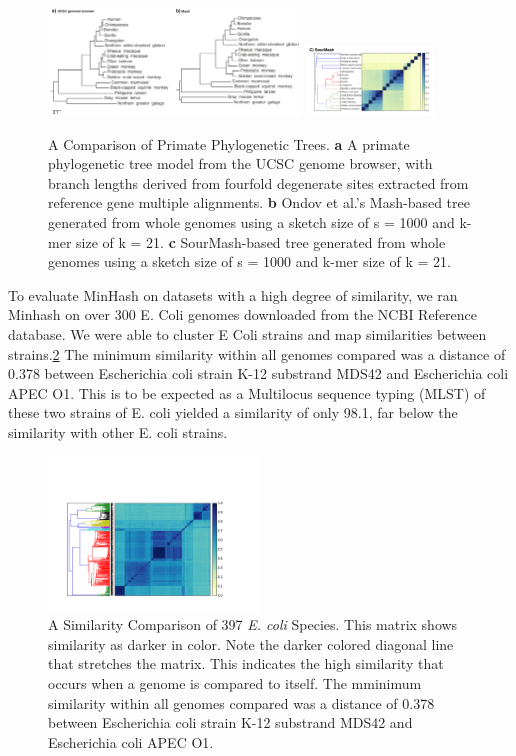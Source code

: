 \documentclass[12pt, letterpaper]{article}
\begin{document}
\begin{figure}[h]
    \centering
    \includegraphics[width=0.6\textwidth]{Figure4_Ondov}
    \includegraphics[width=0.3\textwidth]{Apes_Matrix_Common}
    \caption{A Comparison of Primate Phylogenetic Trees. \textbf{a} A primate phylogenetic tree model from the UCSC genome browser, with branch lengths derived from fourfold degenerate sites extracted from reference gene multiple alignments. \textbf{b} Ondov et al.'s Mash-based tree generated from whole genomes using a sketch size of s = 1000 and k-mer size of k = 21.\cite{MinHash} \textbf{c} SourMash-based tree generated from whole genomes using a sketch size of s = 1000 and k-mer size of k = 21.}
    \label{fig:Primate Tree}
\end{figure}

To evaluate MinHash on datasets with a high degree of similarity, we ran Minhash on over 300 E. Coli genomes downloaded from the NCBI Reference database. We were able to cluster E Coli strains and map similarities between strains.\ref{fig:All Ecoli} The minimum similarity within all genomes compared was a distance of 0.378 between Escherichia coli strain K-12 substrand MDS42 and Escherichia coli APEC O1. This is to be expected as a Multilocus sequence typing (MLST) of these two strains of E. coli yielded a similarity of only 98.1, far below the similarity with other E. coli strains.\cite{E coli}

\begin{figure}[h]
    \centering
    \includegraphics[width=0.5\textwidth]{All_E_coli}
    \caption{A Similarity Comparison of 397 \textit{E. coli} Species. This matrix shows similarity as darker in color. Note the darker colored diagonal line that stretches the matrix. This indicates the high similarity that occurs when a genome is compared to itself. The mminimum similarity within all genomes compared was a distance of 0.378 between Escherichia coli strain K-12 substrand MDS42 and Escherichia coli APEC O1.}
    \label{fig:All Ecoli}
\end{figure}
\end{document}
